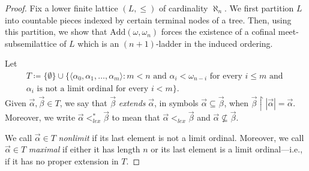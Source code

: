 \documentclass[10pt,a4paper]{amsart}
\begin{document}
\begin{proof}
Fix a lower finite lattice $(L, \le)$ of cardinality $\aleph_n$. We first partition $L$ into countable pieces indexed by certain terminal nodes of a tree. Then, using this partition, we show that $\text{Add}(\omega, \omega_n)$ forces the existence of a cofinal meet-subsemilattice of $L$ which is an $(n+1)$-ladder in the induced ordering. 

Let
\begin{multline*}
T \coloneqq \big\{\emptyset\} \cup \{\langle\alpha_0, \alpha_1, \dots, \alpha_{m}\rangle : m < n \text{ and } \alpha_i < \omega_{n-i} \text{ for every } i \le m \text{ and } \\ \alpha_i \text{ is not a limit ordinal for every } i < m\big\}.
\end{multline*}
Given $\vec{\alpha}, \vec{\beta} \in T$, we say that $\vec{\beta}$ \emph{extends} $\vec{\alpha}$, in symbols $\vec{\alpha} \subseteq \vec{\beta}$, when $\vec{\beta} \upharpoonright |\vec{\alpha}| = \vec{\alpha}$. Moreover, we write $\vec{\alpha} <_{lex}^* \vec{\beta}$ to mean that $\vec{\alpha} <_{lex} \vec{\beta}$ and $\vec{\alpha} \nsubseteq \vec{\beta}$.

We call $\vec{\alpha} \in T$ \emph{nonlimit} if its last element is not a limit ordinal. Moreover, we call $\vec{\alpha} \in T$ \emph{maximal} if either it has length $n$ or its last element is a limit ordinal---i.e., if it has no proper extension in $T$. 



\end{proof}
\end{document}
